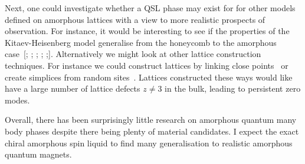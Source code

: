 Next, one could investigate whether a QSL phase may exist for for other models defined on amorphous lattices with a view to more realistic prospects of observation. For instance, it would be interesting to see if the properties of the Kitaev-Heisenberg model generalise from the honeycomb to the amorphous case~{[}\textcite{Chaloupka2010}; \textcite{Chaloupka2015}; \textcite{Jackeli2009}; \textcite{Kalmeyer1989}; \textcite{manousakisSpinTextonehalfHeisenberg1991};{]}. Alternatively we might look at other lattice construction techniques. For instance we could construct lattices by linking close points~\autocite{agarwala2019topological} or create simplices from random sites~\autocite{christRandomLatticeField1982}. Lattices constructed these ways would like have a large number of lattice defects \(z \neq 3\) in the bulk, leading to persistent zero modes.

Overall, there has been surprisingly little research on amorphous quantum many body phases despite there being plenty of material candidates. I expect the exact chiral amorphous spin liquid to find many generalisation to realistic amorphous quantum magnets.
